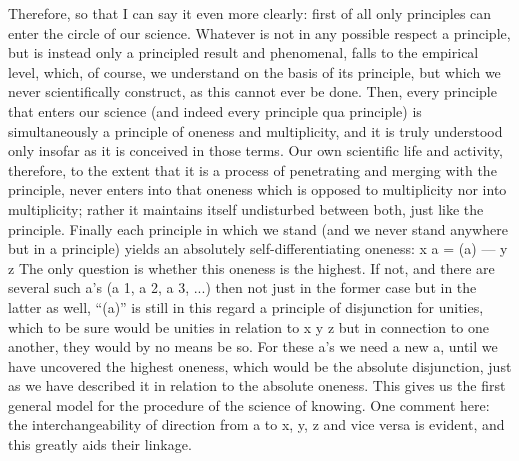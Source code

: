 Therefore, so that I can say it even more clearly:
first of all only principles can enter the circle of our science.
Whatever is not in any possible respect a principle,
but is instead only a principled result and phenomenal,
falls to the empirical level,
which, of course, we understand
on the basis of its principle,
but which we never scientifically construct,
as this cannot ever be done.
Then, every principle that enters our science
(and indeed every principle qua principle) is
simultaneously a principle of oneness and multiplicity,
and it is truly understood only insofar
as it is conceived in those terms.
Our own scientific life and activity,
therefore, to the extent that it is a process of
penetrating and merging with the principle,
never enters into that oneness
which is opposed to multiplicity
nor into multiplicity;
rather it maintains itself undisturbed between both,
just like the principle.
Finally each principle in which we stand
(and we never stand anywhere but in a principle)
yields an absolutely self-differentiating oneness:
x {a = (a) — y} z
The only question is whether this oneness is the highest.
If not, and there are several such a's
(a 1, a 2, a 3, ...)
then not just in the former case
but in the latter as well,
“(a)” is still in this regard
a principle of disjunction for unities,
which to be sure would be unities in relation to
x y z
but in connection to one another,
they would by no means be so.
For these a's we need a new a,
until we have uncovered the highest oneness,
which would be the absolute disjunction,
just as we have described it in relation
to the absolute oneness.
This gives us the first general model
for the procedure of the science of knowing.
One comment here: the interchangeability of
direction from a to x, y, z
and vice versa is evident,
and this greatly aids their linkage.

